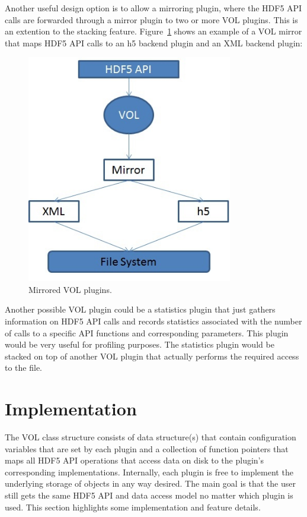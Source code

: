 \documentclass[letterpaper,hyper]{THG_RFC}
\begin{document}
Another useful design option is to allow a mirroring plugin, where the HDF5 API calls are forwarded through a mirror plugin to two or more VOL plugins. This is an extention to the stacking feature. Figure~\ref{fig:mirror} shows an example of a VOL mirror that maps HDF5 API calls to an h5 backend plugin and an XML backend plugin:

\begin{figure}[h!]
\centering
\includegraphics[width=90mm]{mirrored.jpg}
\caption{Mirrored VOL plugins.}
\label{fig:mirror}
\end{figure}

Another possible VOL plugin could be a statistics plugin that just gathers information on HDF5 API calls and records statistics associated with the number of calls to a specific API functions and corresponding parameters. This plugin would be very useful for profiling purposes. The statistics plugin would be stacked on top of another VOL plugin that actually performs the required access to the file.
\clearpage
\section{Implementation}
The VOL class structure consists of data structure(s) that contain configuration variables that are set by each plugin and a collection of function pointers that maps all HDF5 API operations that access data on disk to the plugin's corresponding implementations. Internally, each plugin is free to implement the underlying storage of objects in any way desired. The main goal is that the user still gets the same HDF5 API and data access model no matter which plugin is used. This section highlights some implementation and feature details.  
\end{document}
